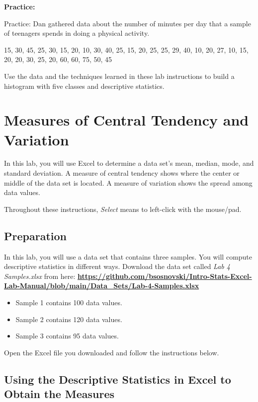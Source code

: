 \documentclass[
]{book}
\providecommand{\tightlist}{%
  \setlength{\itemsep}{0pt}\setlength{\parskip}{0pt}}
\begin{document}
\textbf{Practice:}

Practice:
Dan gathered data about the number of minutes per day that a sample of teenagers spends in doing a physical activity.

15, 30, 45, 25, 30, 15, 20, 10, 30, 40, 25, 15, 20, 25, 25, 29, 40, 10, 20, 27, 10, 15, 20, 20, 30, 25, 20, 60, 60, 75, 50, 45

Use the data and the techniques learned in these lab instructions to build a histogram with five classes and descriptive statistics.

\hypertarget{central-tendency-variation}{%
\chapter{Measures of Central Tendency and Variation}\label{central-tendency-variation}}

In this lab, you will use Excel to determine a data set's mean, median, mode, and standard deviation. A measure of central tendency shows where the center or middle of the data set is located. A measure of variation shows the spread among data values.

Throughout these instructions, \emph{Select} means to left-click with the mouse/pad.

\hypertarget{preparation-1}{%
\section{Preparation}\label{preparation-1}}

In this lab, you will use a data set that contains three samples. You will compute descriptive statistics in different ways. Download the data set called \emph{Lab 4 Samples.xlsx} from here: \href{https://github.com/bsosnovski/Intro-Stats-Excel-Lab-Manual/blob/main/Data_Sets/Lab-4-Samples.xlsx}{\textbf{https://github.com/bsosnovski/Intro-Stats-Excel-Lab-Manual/blob/main/Data\_Sets/Lab-4-Samples.xlsx}}

\begin{itemize}
\tightlist
\item
  Sample 1 contains 100 data values.
\item
  Sample 2 contains 120 data values.
\item
  Sample 3 contains 95 data values.
\end{itemize}

Open the Excel file you downloaded and follow the instructions below.

\hypertarget{descriptive-stats}{%
\section{Using the Descriptive Statistics in Excel to Obtain the Measures}\label{descriptive-stats}}
\end{document}
